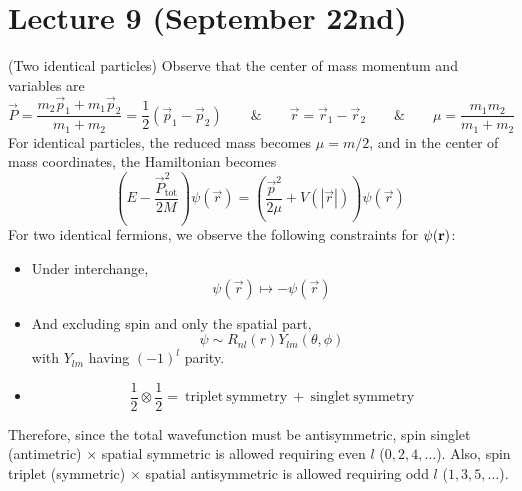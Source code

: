 \section{Lecture 9 (September 22nd)}
\begin{prop}
(Two identical particles) Observe that the center of mass momentum and variables are
\[\vec{P}=\dfrac{m_2\vec{p}_{1}+m_1\vec{p}_{2}}{m_1+m_2}=\dfrac{1}{2}(\vec{p}_{1}-\vec{p}_{2})\qquad\&\qquad \vec{r}=\vec{r}_{1}-\vec{r}_{2}\qquad\&\qquad \mu=\dfrac{m_1m_2}{m_1+m_2}\]
For identical particles, the reduced mass becomes $\mu=m/2$, and in the center of mass coordinates, the Hamiltonian becomes
\[\left( E - \frac{\vec{P}_{\text{tot}}^{2}}{2M} \right)\psi(\vec{r})
= \left( \frac{\vec{p}^{2}}{2\mu} + V(|\vec{r}|) \right)\psi(\vec{r})\]
For two identical fermions, we observe the following constraints for $\psi ({\bf r})$:
\begin{itemize}
\item[(i)] Under interchange,
\[\psi (\vec{r})\mapsto -\psi (\vec{r})\]
\item[(ii)] And excluding spin and only the spatial part,
\[\psi \sim R_{nl}(r)Y_{lm}(\theta ,\phi )\]
with $Y_{lm}$ having $(-1)^{l}$ parity.
\item[(iii)] 
\[\dfrac{1}{2}\otimes \dfrac{1}{2}=\mathrm{\ triplet\ symmetry\ +\ singlet\ symmetry}\]
\end{itemize}
Therefore, since the total wavefunction must be antisymmetric, spin singlet (antimetric) $\times$ spatial symmetric is allowed requiring even $l$ ($0,2,4,\ldots $). Also, spin triplet (symmetric) $\times $ spatial antisymmetric is allowed requiring odd $l$ ($1,3,5,\ldots $).
\end{prop}
\vspace{2ex}
